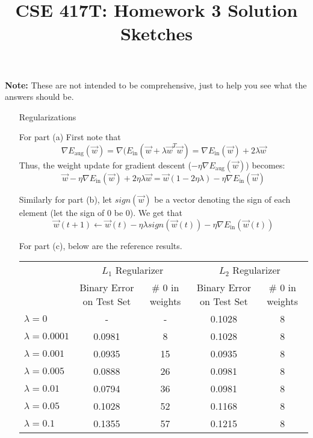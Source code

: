 \documentclass[10pt]{article}
\begin{document}
\title{CSE 417T: Homework 3 Solution Sketches}



\maketitle

\noindent \textbf{Note:} These are not intended to be comprehensive,
just to help you see what the answers should be.

\begin{enumerate}

\item[Regularizations]

For part (a) First note that
  \[\nabla E_{\text{aug}} (\vec{w}) = \nabla (E_{\text{in}}
  (\vec{w} +\lambda \vec{w}^T \vec{w}) = \nabla E_{\text{in}}
  (\vec{w}) + 2 \lambda \vec{w} \]
  Thus, the weight update for gradient descent ($-\eta \nabla
  E_{\text{aug}} (\vec{w})$) becomes:
  \[ \vec{w} - \eta \nabla E_{\text{in}} (\vec{w}) + 2 \eta \lambda \vec{w} =
  \vec{w} (1 - 2\eta\lambda) - \eta \nabla E_{\text{in}} (\vec{w}) \]

Similarly for part (b), let $sign(\vec{w})$ be a vector denoting the sign of each element (let the sign of 0 be 0). 
We get that
\[
    \vec{w}(t+1) \leftarrow \vec{w}(t) - \eta\lambda sign(\vec{w}(t)) - \eta\nabla E_{\text{in}}(\vec{w}(t))
\]

For part (c), below are the reference results.

\begin{center}
\begin{tabular}{l|c|c|c|c}
& \multicolumn{2}{c|}{$L_1$ Regularizer} & \multicolumn{2}{c}{$L_2$ Regularizer} \\
& Binary Error on Test Set & \# 0 in weights & Binary Error on Test Set & \# 0 in weights \\ \hline
$\lambda=0$ & - & - & 0.1028 & 8\\
$\lambda=0.0001$ & 0.0981 & 8 & 0.1028 & 8\\
$\lambda=0.001$ & 0.0935 & 15 & 0.0935 & 8\\
$\lambda=0.005$ & 0.0888 & 26 & 0.0981 & 8\\
$\lambda=0.01$ & 0.0794 & 36 & 0.0981  & 8\\
$\lambda=0.05$ & 0.1028 & 52 & 0.1168 & 8\\
$\lambda=0.1$ & 0.1355 & 57 & 0.1215 & 8\\
\end{tabular}
\end{center}



\end{enumerate}
\end{document}
